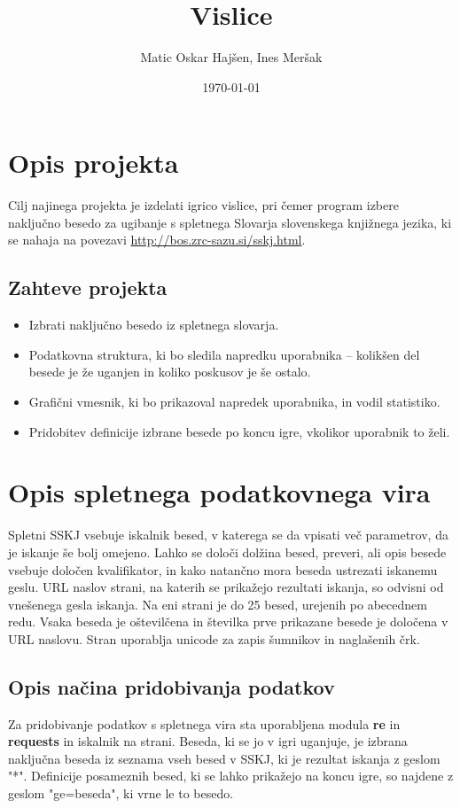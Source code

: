 \documentclass [a4paper, 12pt] {article}
\title {Vislice}
\author {Matic Oskar Hajšen, Ines Meršak}
\date {\today}
\begin{document}
\maketitle
\tableofcontents

\newpage

\section {Opis projekta}
Cilj najinega projekta je izdelati igrico vislice, pri čemer program izbere naključno besedo za ugibanje s spletnega Slovarja slovenskega knjižnega jezika, ki se nahaja na povezavi \url{http://bos.zrc-sazu.si/sskj.html}.
\subsection {Zahteve projekta}
\begin {itemize}
\item Izbrati naključno besedo iz spletnega slovarja.
\item Podatkovna struktura, ki bo sledila napredku uporabnika -- kolikšen del besede je že uganjen in koliko poskusov je še ostalo.
\item Grafični vmesnik, ki bo prikazoval napredek uporabnika, in vodil statistiko.
\item  Pridobitev definicije izbrane besede po koncu igre, vkolikor uporabnik to želi.
\end {itemize}

\section {Opis spletnega podatkovnega vira}
Spletni SSKJ vsebuje iskalnik besed, v katerega se da vpisati več parametrov, da je iskanje še bolj omejeno. Lahko se določi dolžina besed, preveri, ali opis besede vsebuje določen kvalifikator, in kako natančno mora beseda ustrezati iskanemu geslu. URL naslov strani, na katerih se prikažejo rezultati iskanja, so odvisni od vnešenega gesla iskanja. Na eni strani je do 25 besed, urejenih po abecednem redu. Vsaka beseda je oštevilčena in številka prve prikazane besede je določena v URL naslovu. Stran uporablja unicode za zapis šumnikov in naglašenih črk.
\subsection {Opis načina pridobivanja podatkov}
Za pridobivanje podatkov s spletnega vira sta uporabljena modula \textbf {re} in \textbf {requests} in iskalnik na strani. Beseda, ki se jo v igri uganjuje, je izbrana naključna beseda iz seznama vseh besed v SSKJ, ki je rezultat iskanja z geslom "*". Definicije posameznih besed, ki se lahko prikažejo na koncu igre, so najdene z geslom "ge=beseda", ki vrne le to besedo.
\end{document}
